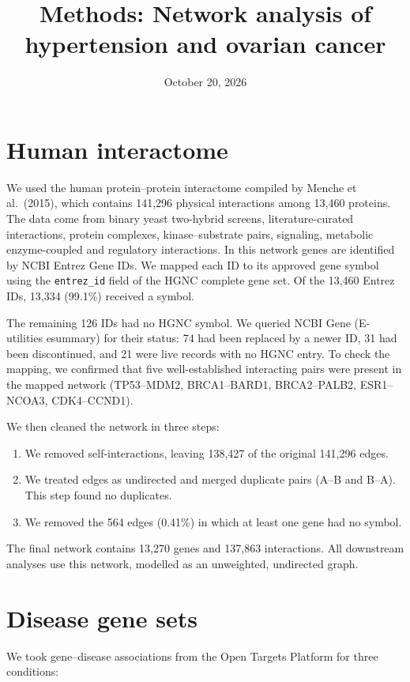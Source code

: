 \documentclass[11pt]{article}
\title{Methods: Network analysis of hypertension and ovarian cancer}
\date{October 20, 2026}
\begin{document}
\maketitle

\section{Human interactome}

We used the human protein--protein interactome compiled by Menche et al.\ (2015), which contains 141,296 physical interactions among 13,460 proteins. The data come from binary yeast two-hybrid screens, literature-curated interactions, protein complexes, kinase--substrate pairs, signaling, metabolic enzyme-coupled and regulatory interactions. In this network genes are identified by NCBI Entrez Gene IDs. We mapped each ID to its approved gene symbol using the \texttt{entrez\_id} field of the HGNC complete gene set. Of the 13,460 Entrez IDs, 13,334 (99.1\%) received a symbol.

The remaining 126 IDs had no HGNC symbol. We queried NCBI Gene (E-utilities esummary) for their status: 74 had been replaced by a newer ID, 31 had been discontinued, and 21 were live records with no HGNC entry. To check the mapping, we confirmed that five well-established interacting pairs were present in the mapped network (TP53--MDM2, BRCA1--BARD1, BRCA2--PALB2, ESR1--NCOA3, CDK4--CCND1).

We then cleaned the network in three steps:

\begin{enumerate}
  \item We removed self-interactions, leaving 138,427 of the original 141,296 edges.
  \item We treated edges as undirected and merged duplicate pairs (A--B and B--A). This step found no duplicates.
  \item We removed the 564 edges (0.41\%) in which at least one gene had no symbol.
\end{enumerate}

The final network contains 13,270 genes and 137,863 interactions. All downstream analyses use this network, modelled as an unweighted, undirected graph.

\section{Disease gene sets}

We took gene--disease associations from the Open Targets Platform for three conditions:
\end{document}
